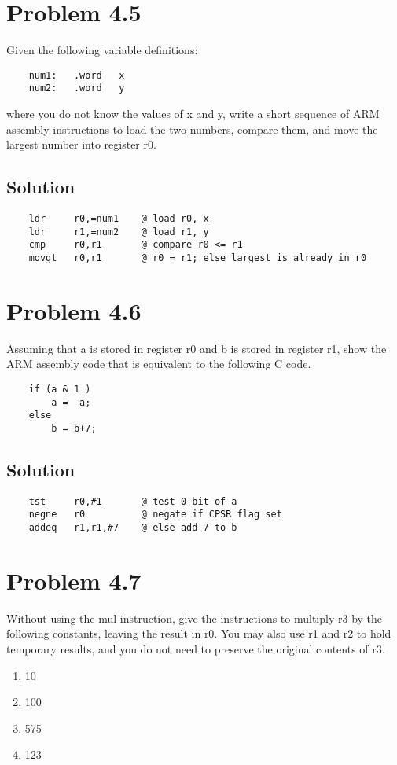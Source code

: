 \documentclass[letterpaper,11pt]{texMemo} %
\begin{document}
\section*{Problem 4.5}
Given the following variable definitions:
\begin{lstlisting}
    num1:   .word   x
    num2:   .word   y
\end{lstlisting}
where you do not know the values of x and y, write a short sequence of ARM assembly instructions to load
the two numbers, compare them, and move the largest number into register r0.
\subsection*{Solution}
\begin{lstlisting}
    ldr     r0,=num1    @ load r0, x
    ldr     r1,=num2    @ load r1, y
    cmp     r0,r1       @ compare r0 <= r1
    movgt   r0,r1       @ r0 = r1; else largest is already in r0
\end{lstlisting}

\section*{Problem 4.6}
Assuming that a is stored in register r0 and b is stored in register r1, show the ARM assembly code that
is equivalent to the following C code.
\begin{lstlisting}
    if (a & 1 )
        a = -a;
    else
        b = b+7;
\end{lstlisting}
\subsection*{Solution}
\begin{lstlisting}
    tst     r0,#1       @ test 0 bit of a
    negne   r0          @ negate if CPSR flag set
    addeq   r1,r1,#7    @ else add 7 to b
\end{lstlisting}

\section*{Problem 4.7}
Without using the mul instruction, give the instructions to multiply r3 by the following constants, leaving
the result in r0. You may also use r1 and r2 to hold temporary results, and you do not need to preserve the
original contents of r3.
\begin{enumerate}[label=\Alph*]
    \item 10
    \item 100
    \item 575
    \item 123
\end{enumerate}
\end{document}
